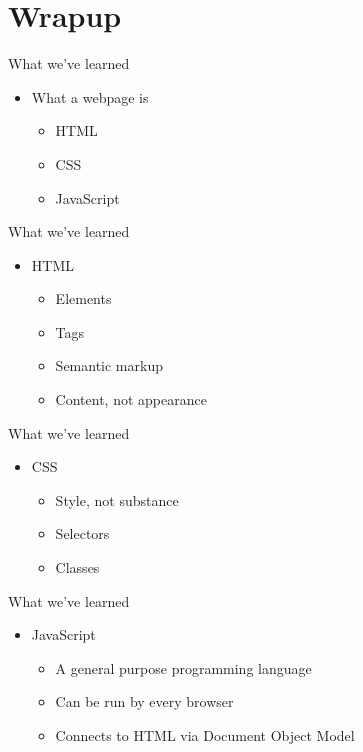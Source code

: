 \documentclass{beamer}
\begin{document}
\section{Wrapup}
\label{sec:orgheadline96}
\begin{frame}[label={sec:orgheadline90}]{What we've learned}
\begin{itemize}
\item What a webpage is \pause
\begin{itemize}
\item HTML \pause
\item CSS \pause
\item JavaScript
\end{itemize}
\end{itemize}
\end{frame}
\begin{frame}[label={sec:orgheadline91}]{What we've learned}
\begin{itemize}
\item HTML \pause
\begin{itemize}
\item Elements \pause
\item Tags \pause
\item Semantic markup \pause
\item Content, not appearance
\end{itemize}
\end{itemize}
\end{frame}
\begin{frame}[label={sec:orgheadline92}]{What we've learned}
\begin{itemize}
\item CSS \pause
\begin{itemize}
\item Style, not substance \pause
\item Selectors \pause
\item Classes
\end{itemize}
\end{itemize}
\end{frame}
\begin{frame}[label={sec:orgheadline93}]{What we've learned}
\begin{itemize}
\item JavaScript \pause
\begin{itemize}
\item A general purpose programming language \pause
\item Can be run by every browser \pause
\item Connects to HTML via Document Object Model
\end{itemize}
\end{itemize}
\end{frame}
\end{document}
